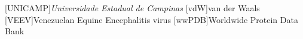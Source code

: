 \documentclass[Ingles]{phdthesis}
\begin{document}
\begin{acronym}
  [UNICAMP]{\textit{Universidade Estadual de Campinas}}
  [vdW]{van der Waals}
  [VEEV]{Venezuelan Equine Encephalitis virus}
  [wwPDB]{Worldwide Protein Data Bank}
\end{acronym}

\clearpage




\clearpage

\tableofcontents

\fimdaspaginasiniciais
\end{document}
